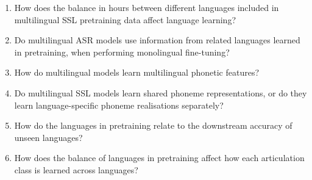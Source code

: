 
\begin{enumerate}[start=1,label={\bfseries RQ\arabic*:}]%
    \item How does the balance in hours between different languages included in multilingual SSL pretraining data affect language learning?
        \item Do multilingual ASR models use information from related languages learned in pretraining, when performing monolingual fine-tuning?
    \item How do multilingual models learn multilingual phonetic features?
        \item Do multilingual SSL models learn shared phoneme representations, or do they learn language-specific phoneme realisations separately?
        \item How do the languages in pretraining relate to the downstream accuracy of unseen languages?
        \item How does the balance of languages in pretraining affect how each articulation class is learned across languages?%
\end{enumerate}
